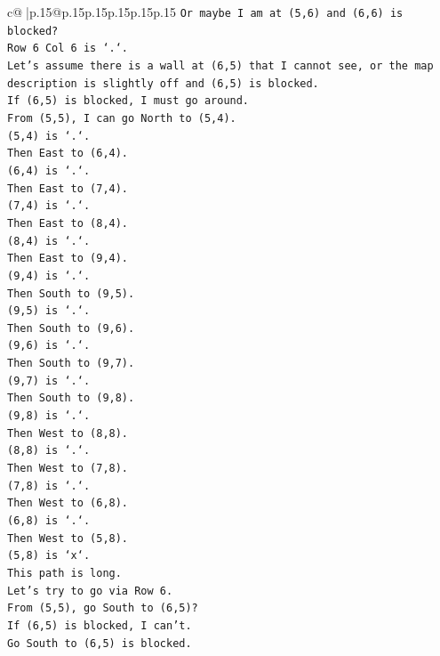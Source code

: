 \documentclass{article}
\begin{document}
{\begin{supertabular}{c@{$\;$}|p{.15\linewidth}@{}p{.15\linewidth}p{.15\linewidth}p{.15\linewidth}p{.15\linewidth}p{.15\linewidth}}
{{{\texttt{Or maybe I am at (5,6) and (6,6) is blocked?} \\
\texttt{Row 6 Col 6 is `.`.} \\
\texttt{Let's assume there is a wall at (6,5) that I cannot see, or the map description is slightly off and (6,5) is blocked.} \\
\texttt{If (6,5) is blocked, I must go around.} \\
\texttt{From (5,5), I can go North to (5,4).} \\
\texttt{(5,4) is `.`.} \\
\texttt{Then East to (6,4).} \\
\texttt{(6,4) is `.`.} \\
\texttt{Then East to (7,4).} \\
\texttt{(7,4) is `.`.} \\
\texttt{Then East to (8,4).} \\
\texttt{(8,4) is `.`.} \\
\texttt{Then East to (9,4).} \\
\texttt{(9,4) is `.`.} \\
\texttt{Then South to (9,5).} \\
\texttt{(9,5) is `.`.} \\
\texttt{Then South to (9,6).} \\
\texttt{(9,6) is `.`.} \\
\texttt{Then South to (9,7).} \\
\texttt{(9,7) is `.`.} \\
\texttt{Then South to (9,8).} \\
\texttt{(9,8) is `.`.} \\
\texttt{Then West to (8,8).} \\
\texttt{(8,8) is `.`.} \\
\texttt{Then West to (7,8).} \\
\texttt{(7,8) is `.`.} \\
\texttt{Then West to (6,8).} \\
\texttt{(6,8) is `.`.} \\
\texttt{Then West to (5,8).} \\
\texttt{(5,8) is `x`.} \\
\texttt{This path is long.} \\
\texttt{Let's try to go via Row 6.} \\
\texttt{From (5,5), go South to (6,5)?} \\
\texttt{If (6,5) is blocked, I can't.} \\
\texttt{Go South to (6,5) is blocked.} \\
}}}
\end{supertabular}}
\end{document}
